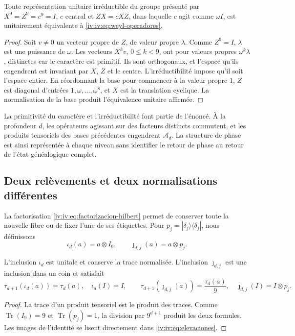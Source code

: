 \begin{theorem}
\label{iv:iv:thm:weyl-unicidad}
Toute représentation unitaire irréductible du groupe présenté par
\(X^9=Z^9=c^9=I\), \(c\) central et \(ZX=cXZ\), dans laquelle
\(c\) agit comme \(\omega I\), est unitairement équivalente à
\eqref{iv:iv:eq:weyl-operadores}.
\end{theorem}
\begin{proof}
Soit \(v\neq0\) un vecteur propre de \(Z\), de valeur propre \(\lambda\). Comme \(Z^9=I\), \(\lambda\) est une puissance de \(\omega\). Les vecteurs \(X^kv\), \(0\leq k<9\), ont pour valeurs propres \(\omega^k\lambda\), distinctes car le caractère est primitif. Ils sont orthogonaux, et l'espace qu'ils engendrent est invariant par \(X\), \(Z\) et le centre. L'irréductibilité impose qu'il soit l'espace entier. En réordonnant la base pour commencer à la valeur propre \(1\), \(Z\) est diagonal d'entrées \(1,\omega,\ldots,\omega^8\), et \(X\) est la translation cyclique. La normalisation de la base produit l'équivalence unitaire affirmée.
\end{proof}

La primitivité du caractère et l’irréductibilité font partie de
l’énoncé. À la profondeur \(d\), les opérateurs agissant sur des facteurs
distincts commutent, et les produits tensoriels des bases précédentes
engendrent \(\mathcal A_d\). La structure de phase est ainsi
représentée à chaque niveau sans identifier le retour de phase au
retour de l’état généalogique complet.

\subsection{Deux relèvements et deux normalisations différentes}

La factorisation \eqref{iv:iv:eq:factorizacion-hilbert} permet de conserver
toute la nouvelle fibre ou de fixer l’une de ses étiquettes. Pour
\(p_j=|\delta_j\rangle\langle\delta_j|\), nous définissons
\begin{equation}
 \iota_d(a)=a\otimes I_9,
 \qquad \jmath_{d,j}(a)=a\otimes p_j.
 \label{iv:iv:eq:elevaciones}
\end{equation}
\begin{proposition}
\label{iv:iv:prop:unidad-traza}
L’inclusion \(\iota_d\) est unitale et conserve la trace normalisée.
L’inclusion \(\jmath_{d,j}\) est une inclusion dans un coin et
satisfait
\[
 \tau_{d+1}(\iota_d(a))=\tau_d(a),\quad \iota_d(I)=I,
 \qquad
 \tau_{d+1}(\jmath_{d,j}(a))=\frac{\tau_d(a)}9,
 \quad \jmath_{d,j}(I)=I\otimes p_j.
\]
\end{proposition}
\begin{proof}
La trace d’un produit tensoriel est le produit des traces.
Comme \(\operatorname{Tr}(I_9)=9\) et
\(\operatorname{Tr}(p_j)=1\), la division par \(9^{d+1}\)
produit les deux formules. Les images de l’identité se lisent
directement dans \eqref{iv:iv:eq:elevaciones}.
\end{proof}

